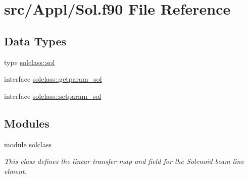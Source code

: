 \hypertarget{_sol_8f90}{}\section{src/\+Appl/\+Sol.f90 File Reference}
\label{_sol_8f90}
\subsection*{Data Types}
\begin{DoxyCompactItemize}
\item 
type \mbox{\hyperlink{namespacesolclass_structsolclass_1_1sol}{solclass\+::sol}}
\item 
interface \mbox{\hyperlink{interfacesolclass_1_1getparam__sol}{solclass\+::getparam\+\_\+sol}}
\item 
interface \mbox{\hyperlink{interfacesolclass_1_1setparam__sol}{solclass\+::setparam\+\_\+sol}}
\end{DoxyCompactItemize}
\subsection*{Modules}
\begin{DoxyCompactItemize}
\item 
module \mbox{\hyperlink{namespacesolclass}{solclass}}
\begin{DoxyCompactList}\small\item\em This class defines the linear transfer map and field for the Solenoid beam line elment. \end{DoxyCompactList}\end{DoxyCompactItemize}
